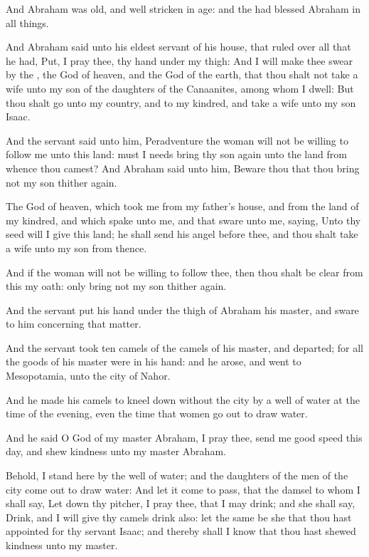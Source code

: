 \verse And Abraham was old, and well stricken in age: and the \LORD had blessed Abraham in all things.

\verse And Abraham said unto his eldest servant of his house, that ruled over all that he had, Put, I pray thee, thy hand under my thigh: \verse And I will make thee swear by the \LORD, the God of heaven, and the God of the earth, that thou shalt not take a wife unto my son of the daughters of the Canaanites, among whom I dwell: \verse But thou shalt go unto my country, and to my kindred, and take a wife unto my son Isaac.

\verse And the servant said unto him, Peradventure the woman will not be willing to follow me unto this land: must I needs bring thy son again unto the land from whence thou camest?  \verse And Abraham said unto him, Beware thou that thou bring not my son thither again.

\verse The \LORD God of heaven, which took me from my father's house, and from the land of my kindred, and which spake unto me, and that sware unto me, saying, Unto thy seed will I give this land; he shall send his angel before thee, and thou shalt take a wife unto my son from thence.

\verse And if the woman will not be willing to follow thee, then thou shalt be clear from this my oath: only bring not my son thither again.

\verse And the servant put his hand under the thigh of Abraham his master, and sware to him concerning that matter.

\verse And the servant took ten camels of the camels of his master, and departed; for all the goods of his master were in his hand: and he arose, and went to Mesopotamia, unto the city of Nahor.

\verse And he made his camels to kneel down without the city by a well of water at the time of the evening, even the time that women go out to draw water.

\verse And he said O \LORD God of my master Abraham, I pray thee, send me good speed this day, and shew kindness unto my master Abraham.

\verse Behold, I stand here by the well of water; and the daughters of the men of the city come out to draw water: \verse And let it come to pass, that the damsel to whom I shall say, Let down thy pitcher, I pray thee, that I may drink; and she shall say, Drink, and I will give thy camels drink also: let the same be she that thou hast appointed for thy servant Isaac; and thereby shall I know that thou hast shewed kindness unto my master.

